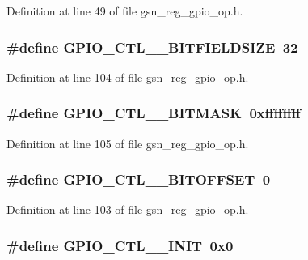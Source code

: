 Definition at line 49 of file gsn\_\-reg\_\-gpio\_\-op.h.

\hypertarget{a00553_aa607fcf8985eb9c8bfd679a99ac44fc3}{
\subsubsection[{GPIO\_\-CTL\_\-0\_\-BITFIELDSIZE}]{\setlength{\rightskip}{0pt plus 5cm}\#define GPIO\_\-CTL\_\_\-BITFIELDSIZE~32}}
\label{a00553_aa607fcf8985eb9c8bfd679a99ac44fc3}


Definition at line 104 of file gsn\_\-reg\_\-gpio\_\-op.h.

\hypertarget{a00553_a3c0780741ae88664cc8552d7e03f5ce0}{
\subsubsection[{GPIO\_\-CTL\_\-0\_\-BITMASK}]{\setlength{\rightskip}{0pt plus 5cm}\#define GPIO\_\-CTL\_\_\-BITMASK~0xffffffff}}
\label{a00553_a3c0780741ae88664cc8552d7e03f5ce0}


Definition at line 105 of file gsn\_\-reg\_\-gpio\_\-op.h.

\hypertarget{a00553_afb352681628b1201441a3cba6da15c96}{
\subsubsection[{GPIO\_\-CTL\_\-0\_\-BITOFFSET}]{\setlength{\rightskip}{0pt plus 5cm}\#define GPIO\_\-CTL\_\_\-BITOFFSET~0}}
\label{a00553_afb352681628b1201441a3cba6da15c96}


Definition at line 103 of file gsn\_\-reg\_\-gpio\_\-op.h.

\hypertarget{a00553_ab08bdaddc99191ff5a64d1f0acb8dd2a}{
\subsubsection[{GPIO\_\-CTL\_\-0\_\-INIT}]{\setlength{\rightskip}{0pt plus 5cm}\#define GPIO\_\-CTL\_\_\-INIT~0x0}}
\label{a00553_ab08bdaddc99191ff5a64d1f0acb8dd2a}


